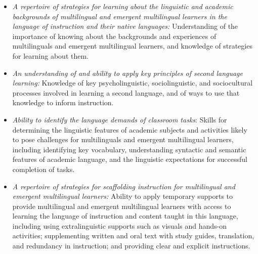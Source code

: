 \documentclass[output=paper]{langscibook}
\begin{document}
\begin{itemize}
\item \textit{A repertoire of strategies for learning about the linguistic and academic backgrounds of multilingual and emergent multilingual learners in the language of instruction and their native languages:} Understanding of the importance of knowing about the backgrounds and experiences of multilinguals and emergent multilingual learners, and knowledge of strategies for learning about them.
\item \textit{An understanding of and ability to apply key principles of second language learning:} Knowledge of key psycholinguistic, sociolinguistic, and sociocultural processes involved in learning a second language, and of ways to use that knowledge to inform instruction. 
\item \textit{Ability to identify the language demands of classroom tasks}: Skills for determining the linguistic features of academic subjects and activities likely to pose challenges for multilinguals and emergent multilingual learners, including identifying key vocabulary, understanding syntactic and semantic features of academic language, and the linguistic expectations for successful completion of tasks.
\item \textit{A repertoire of strategies for scaffolding instruction for multilingual and emergent multilingual learners:} Ability to apply temporary supports to provide multilingual and emergent multilingual learners with access to learning the language of instruction and content taught in this language, including using extralinguistic supports such as visuals and hands-on activities; supplementing written and oral text with study guides, translation, and redundancy in instruction; and providing clear and explicit instructions.               
\end{itemize}
\end{document}
